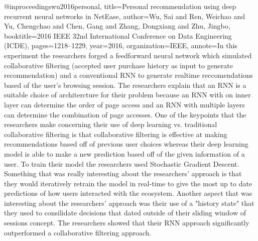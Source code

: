 @inproceedings{wu2016personal,
  title={Personal recommendation using deep recurrent neural networks in NetEase},
  author={Wu, Sai and Ren, Weichao and Yu, Chengchao and Chen, Gang and Zhang, Dongxiang and Zhu, Jingbo},
  booktitle={2016 IEEE 32nd International Conference on Data Engineering (ICDE)},
  pages={1218--1229},
  year={2016},
  organization={IEEE},
  annote={In this experiment the researchers forged a feedforward neural network which simulated collaborative filtering (accepted user purchase history as input to generate recommendation) and a conventional RNN to generate realtime reccomendations based of the user's browsing session. The researchers explain that an RNN is a 
  suitable choice of architercture for their problem because an RNN with on inner layer can determine the order of page access and an RNN with multiple layers can determine the combination of page accesses. One of the keypoints that the researchers make concerning their use of deep learning vs. traditional collaborative filtering is that
  collaborative filtering is effective at making recommendations based off of previous user choices whereas their deep learning model is able to make a new prediction based off of the given information of a user. To train their model the researchers used Stochastic Gradient Descent. Something that was really interesting about the researchers'
  approach is that they would iteratively retrain the model in real-time to give the most up to date predictions of how users interacted with the ecosystem. Another aspect that was interesting about the researchers' approach was their use of a "history state" that they used to consilidate decisions that dated outside of their sliding window of 
  sessions concept. The researchers showed that their RNN approach significantly outperformed a collaborative filtering approach.
  }
}

